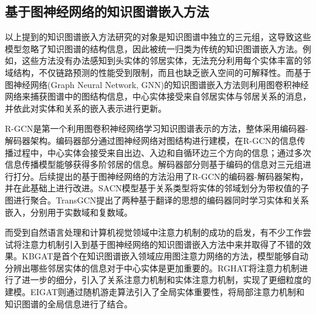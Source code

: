 \subsection{基于图神经网络的知识图谱嵌入方法}

以上提到的知识图谱嵌入方法研究的对象是知识图谱中独立的三元组，这导致这些模型忽略了知识图谱的结构信息，因此被统一归类为传统的知识图谱嵌入方法。例如，这些方法没有办法感知到头实体的邻居实体，无法充分利用每个实体丰富的邻域结构，不仅链路预测的性能受到限制，而且也缺乏嵌入空间的可解释性。而基于图神经网络(Graph Neural Network, GNN)的知识图谱嵌入方法则利用图卷积神经网络来捕获图谱中的图结构信息，中心实体接受来自邻居实体与邻居关系的消息，并依此对实体和关系的嵌入表示进行更新。

R-GCN是第一个利用图卷积神经网络学习知识图谱表示的方法，整体采用编码器-解码器架构。编码器部分通过图神经网络对图结构进行建模，在R-GCN的信息传播过程中，中心实体会接受来自出边、入边和自循环边三个方向的信息；通过多次信息传播模型能够获得多阶邻居的信息。解码器部分则基于编码的信息对三元组进行打分。后续提出的基于图神经网络的方法沿用了R-GCN的编码器-解码器架构，并在此基础上进行改进。SACN模型基于关系类型将实体的邻域划分为带权值的子图进行聚合。TransGCN提出了两种基于翻译的思想的编码器同时学习实体和关系嵌入，分别用于实数域和复数域。

而受到自然语言处理和计算机视觉领域中注意力机制的成功的启发，有不少工作尝试将注意力机制引入到基于图神经网络的知识图谱嵌入方法中来并取得了不错的效果。KBGAT是首个在知识图谱嵌入领域应用图注意力网络的方法，模型能够自动分辨出哪些邻居实体的信息对于中心实体是更加重要的。RGHAT将注意力机制进行了进一步的细分，引入了关系注意力机制和实体注意力机制，实现了更细粒度的建模。EIGAT则通过随机游走算法引入了全局实体重要性，将局部注意力机制和知识图谱的全局信息进行了结合。


